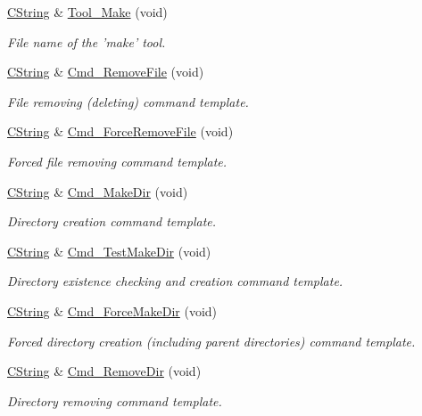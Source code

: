 \begin{DoxyCompactItemize}
\hyperlink{classCString}{C\-String} \& \hyperlink{classCPlatform_a01f2a00985d75daa19d87859a30b63e1}{Tool\-\_\-\-Make} (void)
\begin{DoxyCompactList}\small\item\em File name of the 'make' tool. \end{DoxyCompactList}\item 
\hyperlink{classCString}{C\-String} \& \hyperlink{classCPlatform_a220f5f069b35102e0509c30cfd90ef86}{Cmd\-\_\-\-Remove\-File} (void)
\begin{DoxyCompactList}\small\item\em File removing (deleting) command template. \end{DoxyCompactList}\item 
\hyperlink{classCString}{C\-String} \& \hyperlink{classCPlatform_ab4544b784ceef356c3fe8ab7ff93e6fb}{Cmd\-\_\-\-Force\-Remove\-File} (void)
\begin{DoxyCompactList}\small\item\em Forced file removing command template. \end{DoxyCompactList}\item 
\hyperlink{classCString}{C\-String} \& \hyperlink{classCPlatform_a0a3dfe8621dd6379863b25683fb8d4dc}{Cmd\-\_\-\-Make\-Dir} (void)
\begin{DoxyCompactList}\small\item\em Directory creation command template. \end{DoxyCompactList}\item 
\hyperlink{classCString}{C\-String} \& \hyperlink{classCPlatform_a80dc4b4e4697c9880db18a60fb059c2e}{Cmd\-\_\-\-Test\-Make\-Dir} (void)
\begin{DoxyCompactList}\small\item\em Directory existence checking and creation command template. \end{DoxyCompactList}\item 
\hyperlink{classCString}{C\-String} \& \hyperlink{classCPlatform_a2a7cecad4a781345729f0b6c02973f2f}{Cmd\-\_\-\-Force\-Make\-Dir} (void)
\begin{DoxyCompactList}\small\item\em Forced directory creation (including parent directories) command template. \end{DoxyCompactList}\item 
\hyperlink{classCString}{C\-String} \& \hyperlink{classCPlatform_a6a674c8d4dc36d7d80dab6debffb0d8a}{Cmd\-\_\-\-Remove\-Dir} (void)
\begin{DoxyCompactList}\small\item\em Directory removing command template. \end{DoxyCompactList}\item 

\end{DoxyCompactItemize}
